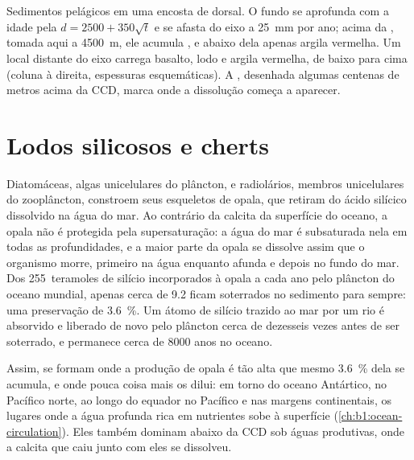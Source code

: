 \begin{omfigure}
{\small Sedimentos pelágicos em uma encosta de dorsal. O fundo se aprofunda com a idade
pela  $d = 2500 + 350\sqrt t$ e se afasta do eixo a \qty{25}{mm} por
ano; acima da , tomada aqui a \qty{4500}{m}, ele
acumula , e abaixo dela apenas argila vermelha. Um local distante do eixo
carrega basalto, lodo e argila vermelha, de baixo para cima (coluna à direita, espessuras
esquemáticas). A , desenhada algumas centenas de metros acima da CCD, marca onde
a dissolução começa a aparecer.}
\label{fig:b1:chemical-biogenic-sediments:flank}
\end{omfigure}

\section{Lodos silicosos e cherts}\label{sec:b1:chemical-biogenic-sediments:silica}

Diatomáceas, algas unicelulares do plâncton, e radiolários, membros unicelulares do
zooplâncton, constroem seus esqueletos de opala, que retiram do ácido silícico dissolvido
na água do mar. Ao contrário da calcita da superfície do oceano, a opala não é protegida
pela supersaturação: a água do mar é subsaturada nela em todas as profundidades, e a maior
parte da opala se dissolve assim que o organismo morre, primeiro na água enquanto afunda e
depois no fundo do mar. Dos 255~teramoles de silício incorporados à opala a cada ano pelo
plâncton do oceano mundial, apenas cerca de 9.2 ficam soterrados no sedimento para sempre:
uma preservação de \qty{3.6}{\%}. Um átomo de silício trazido ao mar por um rio é absorvido
e liberado de novo pelo plâncton cerca de dezesseis vezes antes de ser soterrado, e
permanece cerca de \num{8000} anos no oceano.

Assim,  se formam onde a produção de opala é tão alta que mesmo
\qty{3.6}{\%} dela se acumula, e onde pouca coisa mais os dilui: em torno do oceano
Antártico, no Pacífico norte, ao longo do equador no Pacífico e nas margens continentais,
os lugares onde a água profunda rica em nutrientes sobe à superfície
(\cref{ch:b1:ocean-circulation}). Eles também dominam abaixo da CCD sob águas produtivas,
onde a calcita que caiu junto com eles se dissolveu.

